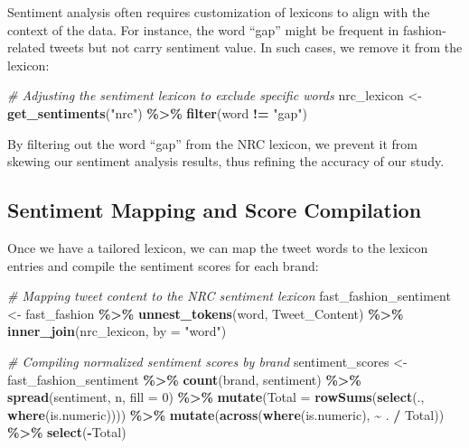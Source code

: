 \documentclass[
]{book}
\newenvironment{Shaded}{\begin{snugshade}}{\end{snugshade}}
\newcommand{\AttributeTok}[1]{\textcolor[rgb]{0.13,0.29,0.53}{#1}}
\newcommand{\CommentTok}[1]{\textcolor[rgb]{0.56,0.35,0.01}{\textit{#1}}}
\newcommand{\DecValTok}[1]{\textcolor[rgb]{0.00,0.00,0.81}{#1}}
\newcommand{\FunctionTok}[1]{\textcolor[rgb]{0.13,0.29,0.53}{\textbf{#1}}}
\newcommand{\NormalTok}[1]{#1}
\newcommand{\OtherTok}[1]{\textcolor[rgb]{0.56,0.35,0.01}{#1}}
\newcommand{\SpecialCharTok}[1]{\textcolor[rgb]{0.81,0.36,0.00}{\textbf{#1}}}
\newcommand{\StringTok}[1]{\textcolor[rgb]{0.31,0.60,0.02}{#1}}
\begin{document}
Sentiment analysis often requires customization of lexicons to align with the context of the data. For instance, the word ``gap'' might be frequent in fashion-related tweets but not carry sentiment value. In such cases, we remove it from the lexicon:

\begin{Shaded}
\begin{Highlighting}[]
\CommentTok{\# Adjusting the sentiment lexicon to exclude specific words}
\NormalTok{nrc\_lexicon }\OtherTok{\textless{}{-}} \FunctionTok{get\_sentiments}\NormalTok{(}\StringTok{"nrc"}\NormalTok{) }\SpecialCharTok{\%\textgreater{}\%}
  \FunctionTok{filter}\NormalTok{(word }\SpecialCharTok{!=} \StringTok{"gap"}\NormalTok{)}
\end{Highlighting}
\end{Shaded}

By filtering out the word ``gap'' from the NRC lexicon, we prevent it from skewing our sentiment analysis results, thus refining the accuracy of our study.

\hypertarget{sentiment-mapping-and-score-compilation}{%
\subsection{Sentiment Mapping and Score Compilation}\label{sentiment-mapping-and-score-compilation}}

Once we have a tailored lexicon, we can map the tweet words to the lexicon entries and compile the sentiment scores for each brand:

\begin{Shaded}
\begin{Highlighting}[]
\CommentTok{\# Mapping tweet content to the NRC sentiment lexicon}
\NormalTok{fast\_fashion\_sentiment }\OtherTok{\textless{}{-}}\NormalTok{ fast\_fashion }\SpecialCharTok{\%\textgreater{}\%}
  \FunctionTok{unnest\_tokens}\NormalTok{(word, Tweet\_Content) }\SpecialCharTok{\%\textgreater{}\%}
  \FunctionTok{inner\_join}\NormalTok{(nrc\_lexicon, }\AttributeTok{by =} \StringTok{"word"}\NormalTok{)}

\CommentTok{\# Compiling normalized sentiment scores by brand}
\NormalTok{sentiment\_scores }\OtherTok{\textless{}{-}}\NormalTok{ fast\_fashion\_sentiment }\SpecialCharTok{\%\textgreater{}\%}
  \FunctionTok{count}\NormalTok{(brand, sentiment) }\SpecialCharTok{\%\textgreater{}\%}
  \FunctionTok{spread}\NormalTok{(sentiment, n, }\AttributeTok{fill =} \DecValTok{0}\NormalTok{) }\SpecialCharTok{\%\textgreater{}\%}
  \FunctionTok{mutate}\NormalTok{(}\AttributeTok{Total =} \FunctionTok{rowSums}\NormalTok{(}\FunctionTok{select}\NormalTok{(., }\FunctionTok{where}\NormalTok{(is.numeric)))) }\SpecialCharTok{\%\textgreater{}\%}
  \FunctionTok{mutate}\NormalTok{(}\FunctionTok{across}\NormalTok{(}\FunctionTok{where}\NormalTok{(is.numeric), }\SpecialCharTok{\textasciitilde{}}\NormalTok{ . }\SpecialCharTok{/}\NormalTok{ Total)) }\SpecialCharTok{\%\textgreater{}\%}
  \FunctionTok{select}\NormalTok{(}\SpecialCharTok{{-}}\NormalTok{Total)}
\end{Highlighting}
\end{Shaded}
\end{document}
